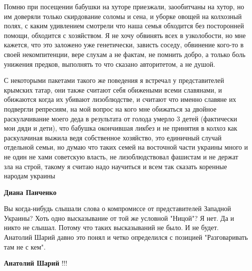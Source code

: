 \begin{itemize}
\begin{itemize}
Помню при посещении бабушки на хуторе приезжали, заообитчаны на хутор, но им
доверяли только скирдование соломы и сена, и уборке овощей на колхозный полях,
с каким удивлением смотрели что наша семья обходится без посторонней помощи,
обходится с хозяйством. Я не хочу обвинять всех в узколобости, но мне кажется,
что это заложено уже генетически, зависть соседу, обвинение кого-то в своей
некомпитенции, вере слухам а не фактам, не помнить добро, а только боль
унижения предков, выполнять то что сказано авторитетом, а не душой.

С некоторыми пакетами такого же поведения я встречал у представителей крымских
татар, они также считают себя обижеными всеми славянами, и обижаются когда их
убивают лизоблюдстве, и считают что именно славяне их подвергли репресиям, на
мой вопрос на кого мне обижаться за двойное раскулачивание моего деда в
результата от голода умерло 3 детей (фактически мои дяди и дети), что бабушка
окончившая ликбез и не принятия в колхоз как раскулачиная выжила ведя
собственное хозяйство, это единичный случай отдельной семьи, но думаю что таких
семей на восточной части украины много и не один не хами советскую власть, не
лизоблюдствовал фашистам и не держат зла на строй, такому я считаю надо
научиться и всем так сказать коренные народам украины

 
\textbf{Диана Панченко} 

Вы когда-нибудь слышали слова о компромиссе от
представителей Западной Украины? Хоть одно высказывание от той же условной
"Ницой"? Я нет. Да и никто не слышал. Потому что таких высказываний не было. И
не будет. Анатолий Шарий давно это понял и четко определился с позицией
"Разговаривать там не с кем".


 
\textbf{Анатолий Шарий} !!!

 

\end{itemize}
\end{itemize}

